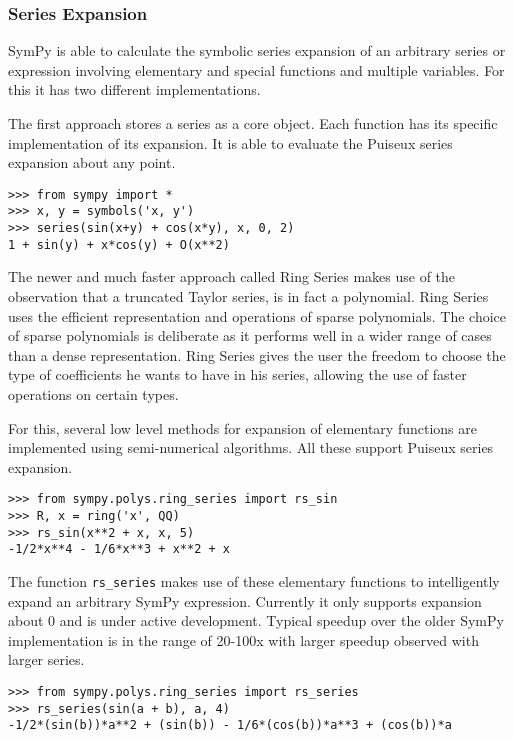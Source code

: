\subsubsection{Series Expansion}

SymPy is able to calculate the symbolic series expansion of an arbitrary series
or expression involving elementary and special functions and multiple
variables. For this it has two different implementations.

The first approach stores a series as a core object. Each function has its
specific implementation of its expansion. It is able to evaluate the Puiseux
series expansion about any point.

\begin{verbatim}
>>> from sympy import *
>>> x, y = symbols('x, y')
>>> series(sin(x+y) + cos(x*y), x, 0, 2)
1 + sin(y) + x*cos(y) + O(x**2)
\end{verbatim}

The newer and much faster approach called Ring Series makes use of the
observation that a truncated Taylor series, is in fact a polynomial.
Ring Series uses the efficient representation and operations of sparse
polynomials. The choice of sparse polynomials is deliberate as it performs
well in a wider range of cases than a dense representation. Ring Series gives 
the user the freedom to choose the type of coefficients he wants to have in
his series, allowing the use of faster operations on certain types.

For this, several low level methods for expansion of elementary functions are
implemented using semi-numerical algorithms. All these support Puiseux series
expansion.

\begin{verbatim}
>>> from sympy.polys.ring_series import rs_sin
>>> R, x = ring('x', QQ)
>>> rs_sin(x**2 + x, x, 5)
-1/2*x**4 - 1/6*x**3 + x**2 + x
\end{verbatim}

The function \texttt{rs\_series} makes use of these elementary functions to
intelligently expand an arbitrary SymPy expression. Currently it only supports
expansion about 0 and is under active development. Typical speedup over
the older SymPy implementation is in the range of 20-100x with larger
speedup observed with larger series.

\begin{verbatim}
>>> from sympy.polys.ring_series import rs_series
>>> rs_series(sin(a + b), a, 4)
-1/2*(sin(b))*a**2 + (sin(b)) - 1/6*(cos(b))*a**3 + (cos(b))*a
\end{verbatim}

